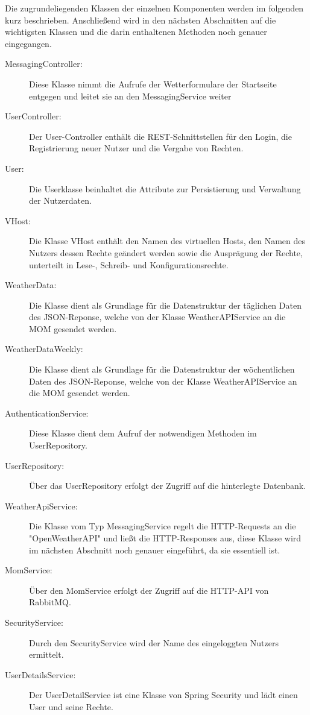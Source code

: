 Die zugrundeliegenden Klassen der einzelnen Komponenten werden im folgenden kurz beschrieben. Anschließend wird in den nächsten Abschnitten auf die wichtigsten Klassen und die darin enthaltenen Methoden noch genauer eingegangen. 

\begin{description}


\item[MessagingController:]Diese Klasse nimmt die Aufrufe der Wetterformulare der Startseite entgegen und leitet sie an den MessagingService weiter

\item[UserController:]Der User-Controller enthält die REST-Schnittstellen für den Login, die Registrierung neuer Nutzer und die Vergabe von Rechten. 
\item[User:]Die Userklasse beinhaltet die Attribute zur Persistierung und Verwaltung der Nutzerdaten.
\item[VHost:] Die Klasse VHost enthält den Namen des virtuellen Hosts, den Namen des Nutzers dessen Rechte geändert werden sowie die Ausprägung der Rechte, unterteilt in Lese-, Schreib- und Konfigurationsrechte.
\item[WeatherData:]Die Klasse dient als Grundlage für die Datenstruktur der täglichen Daten des JSON-Reponse, welche von der Klasse WeatherAPIService an die MOM gesendet werden. 
\item[WeatherDataWeekly:]Die Klasse dient als Grundlage für die Datenstruktur der wöchentlichen Daten des JSON-Reponse, welche von der Klasse WeatherAPIService an die MOM gesendet werden. 
\item[AuthenticationService:]Diese Klasse dient dem Aufruf der notwendigen Methoden im UserRepository.
\item[UserRepository:]Über das UserRepository erfolgt der Zugriff auf die hinterlegte Datenbank.
\item[WeatherApiService:]Die Klasse vom Typ MessagingService regelt die HTTP-Requests an die "OpenWeatherAPI" und ließt die HTTP-Responses aus, diese Klasse wird im nächsten Abschnitt noch genauer eingeführt, da sie essentiell ist. 

\item[MomService:]Über den MomService erfolgt der Zugriff auf die HTTP-API von RabbitMQ.
\item[SecurityService:]Durch den SecurityService wird der Name des eingeloggten Nutzers ermittelt.

\item[UserDetailsService:]Der UserDetailService ist eine Klasse von Spring Security und lädt einen User und seine Rechte.


\end{description}
